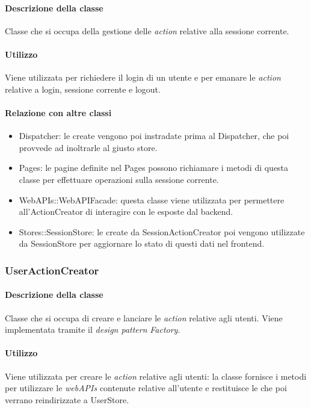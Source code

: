 \paragraph*{Descrizione della classe}
Classe che si occupa della gestione delle \textit{action} relative alla sessione corrente.

\paragraph*{Utilizzo}
Viene utilizzata per richiedere il login di un utente e per emanare le \textit{action} relative a login, sessione corrente e logout.

\paragraph*{Relazione con altre classi}
\begin{itemize}
\item Dispatcher: le  create vengono poi instradate prima al Dispatcher, che poi provvede ad inoltrarle al giusto store.
\item Pages: le pagine definite nel  Pages possono richiamare i metodi di questa classe per effettuare operazioni sulla sessione corrente.
\item WebAPIs::WebAPIFacade: questa classe viene utilizzata per permettere all'ActionCreator di interagire con le  esposte dal backend.
\item Stores::SessionStore: le  create da SessionActionCreator poi vengono utilizzate da SessionStore per aggiornare lo stato di questi dati nel frontend.
\end{itemize}

\subsubsection{UserActionCreator}
\paragraph*{Descrizione della classe}
Classe che si occupa di creare e lanciare le \textit{action} relative agli utenti. Viene implementata tramite il \textit{design pattern} \textit{Factory}.
\paragraph*{Utilizzo}
Viene utilizzata per creare le \textit{action} relative agli utenti: la classe fornisce i metodi per utilizzare le \textit{webAPIs} contenute relative all'utente e restituisce le  che poi verrano reindirizzate a UserStore.

